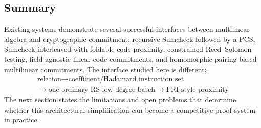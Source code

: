 \subsection{Summary}
\label{sec:comparison-summary}

Existing systems demonstrate several successful interfaces between multilinear algebra and cryptographic commitment: recursive Sumcheck followed by a PCS, Sumcheck interleaved with foldable-code proximity, constrained Reed--Solomon testing, field-agnostic linear-code commitments, and homomorphic pairing-based multilinear commitments.  The interface studied here is different:
\begin{equation}
  \boxed{
  \begin{gathered}
    \text{relation}
    \longrightarrow
    \text{coefficient/Hadamard instruction set}
    \\
    \longrightarrow
    \text{one ordinary RS low-degree batch}
    \longrightarrow
    \text{FRI-style proximity}
  \end{gathered}}
  \label{eq:comparison-framework-summary}
\end{equation}
The next section states the limitations and open problems that determine whether this architectural simplification can become a competitive proof system in practice.
